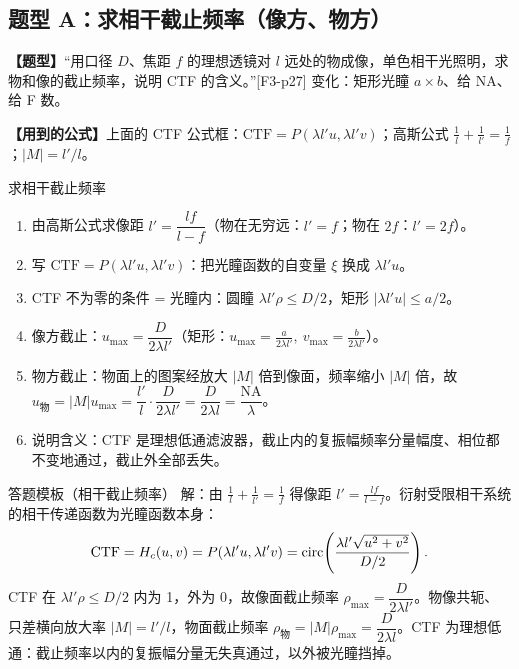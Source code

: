 \subsection*{题型 A：求相干截止频率（像方、物方）}\label{sec:typeA}
\textbf{【题型】}“用口径 $D$、焦距 $f$ 的理想透镜对 $l$ 远处的物成像，单色相干光照明，求物和像的截止频率，说明 CTF 的含义。”[F3-p27] 变化：矩形光瞳 $a\times b$、给 NA、给 F 数。

\textbf{【用到的公式】}上面的 CTF 公式框：$\mathrm{CTF}=P(\lambda l'u,\lambda l'v)$；高斯公式 $\frac1l+\frac1{l'}=\frac1f$；$|M|=l'/l$。

\begin{recipe}{求相干截止频率}
\begin{enumerate}
\item 由高斯公式求像距 $l'=\dfrac{lf}{l-f}$（物在无穷远：$l'=f$；物在 $2f$：$l'=2f$）。
\item 写 $\mathrm{CTF}=P(\lambda l'u,\lambda l'v)$：把光瞳函数的自变量 $\xi$ 换成 $\lambda l'u$。
\item CTF 不为零的条件 = 光瞳内：圆瞳 $\lambda l'\rho\le D/2$，矩形 $|\lambda l'u|\le a/2$。
\item 像方截止：$u_{\max}=\dfrac{D}{2\lambda l'}$（矩形：$u_{\max}=\frac{a}{2\lambda l'},\ v_{\max}=\frac{b}{2\lambda l'}$）。
\item 物方截止：物面上的图案经放大 $|M|$ 倍到像面，频率缩小 $|M|$ 倍，故 $u_{\text{物}}=|M|u_{\max}=\dfrac{l'}{l}\cdot\dfrac{D}{2\lambda l'}=\dfrac{D}{2\lambda l}=\dfrac{\mathrm{NA}}{\lambda}$。
\item 说明含义：CTF 是理想低通滤波器，截止内的复振幅频率分量幅度、相位都不变地通过，截止外全部丢失。
\end{enumerate}
\end{recipe}

\begin{exam}{答题模板（相干截止频率）}
解：由 $\frac1l+\frac1{l'}=\frac1f$ 得像距 $l'=\frac{lf}{l-f}$。衍射受限相干系统的相干传递函数为光瞳函数本身：
\[
\mathrm{CTF}=H_c(u,v)=P(\lambda l'u,\lambda l'v)=\operatorname{circ}\!\left(\frac{\lambda l'\sqrt{u^2+v^2}}{D/2}\right).
\]
CTF 在 $\lambda l'\rho\le D/2$ 内为 1，外为 0，故像面截止频率 $\rho_{\max}=\dfrac{D}{2\lambda l'}$。物像共轭、只差横向放大率 $|M|=l'/l$，物面截止频率 $\rho_{\text{物}}=|M|\rho_{\max}=\dfrac{D}{2\lambda l}$。CTF 为理想低通：截止频率以内的复振幅分量无失真通过，以外被光瞳挡掉。
\end{exam}

